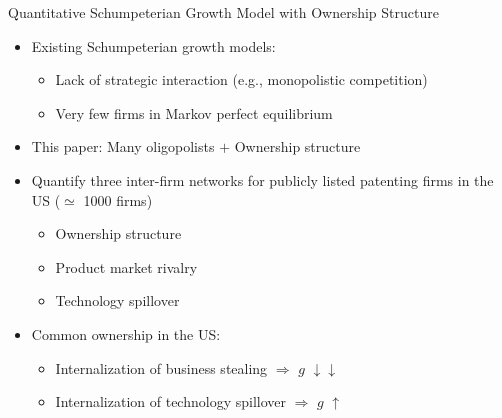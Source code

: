 \documentclass[
  aspectratio=169,  %
]{beamer}
\theoremstyle{plain}
\begin{document}
\begin{frame}{Quantitative Schumpeterian Growth Model with Ownership Structure}
  \begin{itemize}
    \item Existing Schumpeterian growth models:
    \begin{itemize}
      \item Lack of strategic interaction (e.g., monopolistic competition)
      \item Very few firms in Markov perfect equilibrium
    \end{itemize}
    \medskip{}
    \item This paper: Many oligopolists $+$ Ownership structure
    \medskip{}\pause
    \item Quantify three inter-firm networks for publicly listed patenting firms in the US ($\simeq$ 1000 firms)
    \begin{itemize}
      \item Ownership structure
      \item Product market rivalry
      \item Technology spillover
    \end{itemize}
    \medskip{}\pause
    \item Common ownership in the US:
    \begin{itemize}
      \item Internalization of business stealing $\Longrightarrow$ $g$ $\downarrow \downarrow$
      \item Internalization of technology spillover $\Longrightarrow$ $g$ $\uparrow$
    \end{itemize}
  \end{itemize}
\end{frame}
\end{document}
